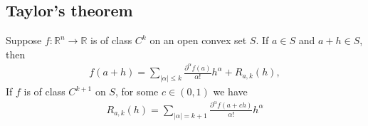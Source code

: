 \subsection{Taylor’s theorem}
\label{taylor}
Suppose $f:\mathbb{R}^n \to \mathbb{R}$ is of class $C^k$ on an open convex set $S$. If $a \in S$ and $a+h \in S$, then
\begin{align*}
f(a+h) = \sum\limits_{|\alpha| \leq k} \frac{\partial^\alpha f(a)}{\alpha!}h^\alpha + R_{a,k}(h),
\end{align*}
If $f$ is of class $C^{k+1}$ on $S$, for some $c \in (0, 1)$ we have
\begin{align*}
 R_{a,k}(h) = \sum\limits_{|\alpha| = k+1} \frac{\partial^\alpha f(a+ch)}{\alpha!}h^\alpha
\end{align*}